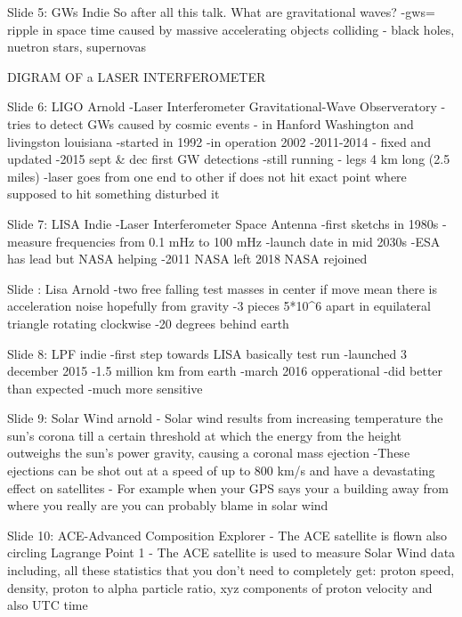     Slide 5: GWs Indie
        So after all this talk. What are gravitational waves?
        -gws= ripple in space time caused by massive accelerating objects colliding - black holes, nuetron stars, supernovas
       
    DIGRAM OF a LASER INTERFEROMETER

    
    
    
    Slide 6: LIGO Arnold
        -Laser Interferometer Gravitational-Wave Observeratory
        -tries to detect GWs caused by cosmic events
        - in Hanford Washington and livingston louisiana
        -started in 1992
        -in operation 2002
        -2011-2014 - fixed and updated
        -2015 sept & dec first GW detections
        -still running
        - legs 4 km long (2.5 miles)
        -laser goes from one end to other if does not hit exact point where supposed to hit something disturbed it
        
        
    
    Slide 7: LISA Indie
        -Laser Interferometer Space Antenna
        -first sketchs in 1980s
        -measure frequencies from 0.1 mHz to 100 mHz
        -launch date in mid 2030s
        -ESA has lead but NASA helping
        -2011 NASA left 2018 NASA rejoined
       
    Slide : Lisa Arnold
    -two free falling test masses in center if move mean there is acceleration noise hopefully from gravity
    -3 pieces 5*10^6 apart in equilateral triangle rotating clockwise 
    -20 degrees behind earth
    
    
    Slide 8: LPF indie
        -first step towards LISA basically test run
        -launched 3 december 2015
        -1.5 million km from earth
        -march 2016 opperational
        -did better than expected
        -much more sensitive
    
    Slide 9: Solar Wind arnold
        - Solar wind results from increasing temperature the sun's corona till a certain threshold at which the energy from the height outweighs the sun's power gravity, causing a coronal mass ejection  
        -These ejections can be shot out at a speed of up to 800 km/s and have a devastating effect on satellites
        - For example when your GPS says your a building away from where you really are you can probably blame in solar wind
    
    Slide 10: ACE-Advanced Composition Explorer
        - The ACE satellite is flown also circling Lagrange Point 1
        - The ACE satellite is used to measure Solar Wind data including, all these statistics that you don't need to completely get: proton speed, density, proton to alpha particle ratio, xyz components of proton velocity and also UTC time
        
